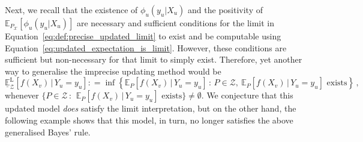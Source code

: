 \documentclass[3p]{elsarticle}
\newcommand{\states}{\mathcal{X}}
\newcommand{\coloneqq}{:\!=}
\begin{document}
Next, we recall that the existence of $\phi_u(y_u\vert X_u)$ and the positivity of $\mathbb{E}_{P_\states}[\phi_u(y_u\vert X_u)]$ are necessary and sufficient conditions for the limit in Equation~\eqref{eq:def:precise_updated_limit} to exist and be computable using Equation~\eqref{eq:updated_expectation_is_limit}. However, these conditions are sufficient but non-necessary for that limit to simply exist. Therefore, yet another way to generalise the imprecise updating method would be
\begin{equation*}
\underline{\mathbb{E}}_\mathcal{Z}^\mathrm{L}[f(X_v)\,\vert\,Y_u=y_u] \coloneqq \inf\left\{ \mathbb{E}_P[f(X_v)\,\vert\,Y_u=y_u]\,:\, P\in\mathcal{Z},~\text{$\mathbb{E}_P[f(X_v)\,\vert\,Y_u=y_u]$ exists} \right\}\,,
\end{equation*}
whenever $\{P\in\mathcal{Z}\,:\,~\text{$\mathbb{E}_P[f(X_v)\,\vert\,Y_u=y_u]$ exists}\}\neq\emptyset$. We conjecture that this updated model \emph{does} satisfy the limit interpretation, but on the other hand, the following example shows that this model, in turn, no longer satisfies the above generalised Bayes' rule. 
\end{document}

